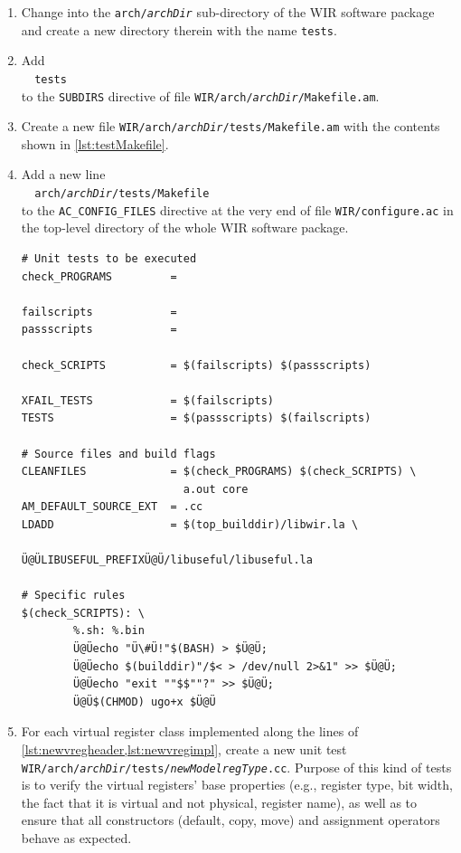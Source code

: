 \begin{enumerate}[resume]
  \item Change into the \texttt{arch/{\itshape archDir}} sub-directory of the \gls{WIR} software package and create a new directory therein with the name \texttt{tests}.

  \item Add \\
  \verb|  |\texttt{tests} \\
  to the \texttt{SUBDIRS} directive of file \texttt{WIR/arch/{\itshape archDir}/Makefile.am}.

  \item Create a new file \texttt{WIR/arch/{\itshape archDir}/tests/Makefile.am} with the contents shown in \cref{lst:testMakefile}.

  \item Add a new line \\
  \verb|  arch/|\texttt{\itshape archDir}\verb|/tests/Makefile| \\
  to the \texttt{AC\_CONFIG\_FILES} directive at the very end of file \texttt{WIR/configure.ac} in the top-level directory of the whole \gls{WIR} software package.

\begin{lstlisting}[style=commandline,float=t,caption={Rudimentary Makefile for Unit Tests},label=lst:testMakefile]
# Unit tests to be executed
check_PROGRAMS         =

failscripts            =
passscripts            =

check_SCRIPTS          = $(failscripts) $(passscripts)

XFAIL_TESTS            = $(failscripts)
TESTS                  = $(passscripts) $(failscripts)

# Source files and build flags
CLEANFILES             = $(check_PROGRAMS) $(check_SCRIPTS) \
                         a.out core
AM_DEFAULT_SOURCE_EXT  = .cc
LDADD                  = $(top_builddir)/libwir.la \
                         Ü@ÜLIBUSEFUL_PREFIXÜ@Ü/libuseful/libuseful.la

# Specific rules
$(check_SCRIPTS): \
        %.sh: %.bin
        Ü@Üecho "Ü\#Ü!"$(BASH) > $Ü@Ü;
        Ü@Üecho $(builddir)"/$< > /dev/null 2>&1" >> $Ü@Ü;
        Ü@Üecho "exit ""$$""?" >> $Ü@Ü;
        Ü@Ü$(CHMOD) ugo+x $Ü@Ü
\end{lstlisting}

  \item For each virtual register class implemented along the lines of \cref{lst:newvregheader,lst:newvregimpl}, create a new unit test \texttt{WIR/arch/{\itshape archDir}/tests/{\itshape newModelregType}.cc}.\label{enum:vregTest}
  Purpose of this kind of tests is to verify the virtual registers' base properties (e.g., register type, bit width, the fact that it is virtual and not physical, register name), as well as to ensure that all constructors (default, copy, move) and assignment operators behave as expected.


\end{enumerate}
